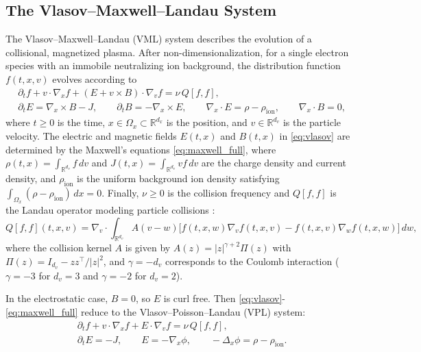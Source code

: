 \documentclass[]{article}
\newcommand{\R}{\mathbb{R}}
\numberwithin{equation}{section}
\begin{document}
\subsection{The Vlasov--Maxwell--Landau System}
\label{sec:vml}
The Vlasov--Maxwell--Landau (VML) system describes the evolution of a collisional, magnetized plasma.  After non-dimensionalization, for a single electron species with an immobile neutralizing ion background, the distribution function $f(t, x, v)$ evolves according to
\begin{align}
\label{eq:vlasov}
&\partial_t f + v \cdot \nabla_x f + (E + v \times B) \cdot \nabla_v f = \nu \, Q[f, f],  \\
\label{eq:maxwell_full}
&\partial_t E = \nabla_x \times B - J, \qquad \partial_t B = -\nabla_x \times E, \qquad \nabla_x \cdot E = \rho - \rho_{\mathrm{ion}}, \qquad \nabla_x \cdot B = 0, 
\end{align}
where $t\geq 0$ is the time, $x\in \Omega_x\subset \R^{d_x}$ is the position, and $v\in \R^{d_v}$ is the particle velocity. The electric and magnetic fields $E(t,x)$ and $B(t,x)$ in \eqref{eq:vlasov}   are determined by the Maxwell's equations \eqref{eq:maxwell_full}, where $\rho(t,x)=\int_{\R^{d_v}}f \, dv$ and $J(t,x)=\int_{\R^{d_v}} v f \, dv$ are the charge density and current density, and $\rho_{\mathrm{ion}}$ is the uniform background ion density satisfying $\int_{\Omega_x}(\rho-\rho_{\mathrm{ion}})\, dx=0$. Finally, $\nu \geq 0$ is the collision frequency and $Q[f, f]$ is the Landau operator modeling particle collisions \citep{landau1936kinetische}:
\begin{equation}
\label{eq:landau}
Q[f, f](t,x, v) = \nabla_v \cdot \int_{\R^{d_v}} A(v - w) \big[ f(t,x,w) \nabla_v f(t,x,v) - f(t,x,v) \nabla_w f(t,x,w) \big] \, dw,
\end{equation}
where the collision kernel $A$ is given by $A(z) = |z|^{\gamma+2} \Pi(z)$ with $\Pi(z) = I_{d_v} - z z^\top / |z|^2$, and $\gamma = -d_v$ corresponds to the Coulomb interaction ($\gamma=-3$ for $d_v=3$ and $\gamma=-2$ for $d_v=2$).

In the electrostatic case, $B=0$, so $E$ is curl free. Then \eqref{eq:vlasov}-\eqref{eq:maxwell_full} reduce to the Vlasov--Poisson--Landau (VPL) system:
\begin{align}
\label{eq:vpl_1}
&\partial_t f + v \cdot \nabla_x f + E \cdot \nabla_v f = \nu\, Q[f,f], \\
\label{eq:vpl_2}
& \partial_t E=-J, \qquad E = -\nabla_x \phi, \qquad -\Delta_x \phi = \rho - \rho_{\mathrm{ion}}.
\end{align}
\end{document}
